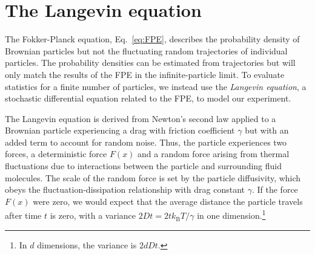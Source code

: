 \documentclass[hyperref={colorlinks=true, urlcolor=blue, citecolor=blue, final, bound}]{sfuthesis}
\newcommand{\kB}{k_{\mathrm{B}}}
\begin{document}
\section{The Langevin equation}
The Fokker-Planck equation, Eq.~\ref{eq:FPE}, describes the probability density of Brownian particles but not the fluctuating random trajectories of individual particles. The probability densities can be estimated from trajectories but will only match the results of the FPE in the infinite-particle limit. To evaluate statistics for a finite number of particles, we instead use the \textit{Langevin equation}, a stochastic differential equation related to the FPE, to model our experiment. 

The Langevin equation is derived from Newton's second law applied to a Brownian particle experiencing a drag with friction coefficient $\gamma$ but with an added term to account for random noise. Thus, the particle experiences two forces, a deterministic force $F(x)$ and a random force arising from thermal fluctuations due to interactions between the particle and surrounding fluid molecules. The scale of the random force is set by the particle diffusivity, which obeys the fluctuation-dissipation relationship with drag constant $\gamma$. 
If the force $F(x)$ were zero, we would expect that the average distance the particle travels after time $t$ is zero, with a variance $2Dt=2t\kB T/\gamma$ in one dimension.\footnote{In $d$ dimensions, the variance is $2dDt$.}
\end{document}
